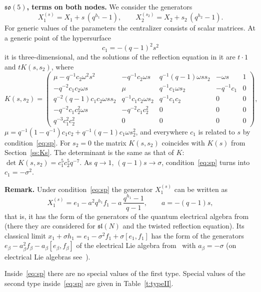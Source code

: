 \documentclass[12pt,a4paper]{article}
\newcommand{\so}{\mathfrak{so}}
\begin{document}
\textbf{$\so(5)$, terms on both nodes.} We consider the generators
\[
X^{(s)}_1=X_1+s\,(q^{h_1}-1),\qquad X^{(s_2)}_2=X_2+s_2\,(q^{h_2}-1).
\]
For generic values of the parameters the centralizer consists of scalar matrices. At a generic point of the hypersurface
\begin{equation}\label{eq:sp}
c_1=-(q-1)^2s^2
\end{equation}
it is three-dimensional, and the solutions of the reflection equation in it are $t\cdot1$ and $tK(s,s_2)$, where
{\setlength{\arraycolsep}{4pt}
\[
K(s,s_2)=\begin{pmatrix}
\mu-q^{-1}c_2\omega^2s^2 & -q^{-1}c_2\omega s & q^{-1}(q-1)\omega ss_2 & -\omega s & 1 \\
-q^{-2}c_1c_2\omega s & \mu & q^{-1}c_1\omega s_2 & -q^{-1}c_1 & 0 \\
q^{-2}(q-1)c_1c_2\omega ss_2 & q^{-1}c_1c_2\omega s_2 & q^{-1}c_1c_2 & 0 & 0 \\
-q^{-2}c_1c_2^{2}\omega s & -q^{-2}c_1c_2^{2} & 0 & 0 & 0 \\
q^{-3}c_1^{2}c_2^{2} & 0 & 0 & 0 & 0
\end{pmatrix},
\]
}
$\mu=q^{-1}(1-q^{-1})c_1c_2+q^{-1}(q-1)c_1\omega s_2^2$, and everywhere $c_1$ is related to $s$ by condition~\eqref{eq:sp}. For $s_2=0$
the matrix $K(s,s_2)$ coincides with $K(s)$ from Section~\ref{ss:Ks}.
The determinant is the same as that of $K$: $\det K(s,s_2)=c_1^5c_2^5q^{-7}$. As $q\to1$, $(q-1)s\to\sigma$,
condition~\eqref{eq:sp} turns into $c_1=-\sigma^2$.

\textbf{Remark.} Under condition~\eqref{eq:sp} the generator $X^{(s)}_1$ can be written as
\[
X^{(s)}_1=e_1-a^2q^{h_1}f_1-a\,\frac{q^{h_1}-1}{q-1},\qquad a=-(q-1)s,
\]
that is, it has the form of the generators of the quantum electrical algebra from~\cite[Section~3.1]{AMS2} (there they are considered for
$\mathfrak{sl}(N)$ and the twisted reflection equation). Its classical limit
$x_1+\sigma h_1=e_1-\sigma^2f_1+\sigma[e_1,f_1]$ has the form of the generators $e_\beta-a_\beta^2f_\beta-a_\beta[e_\beta,f_\beta]$
of the electrical Lie algebra from~\cite[Section~3.1]{AMS2} with $a_\beta=-\sigma$ (on electrical Lie algebras
see~\cite{LP,BGG}).

Inside~\eqref{eq:sp} there are no special values of the first type. Special
values of the second type inside~\eqref{eq:sp} are given in Table~\ref{t:typeII}.
\end{document}
